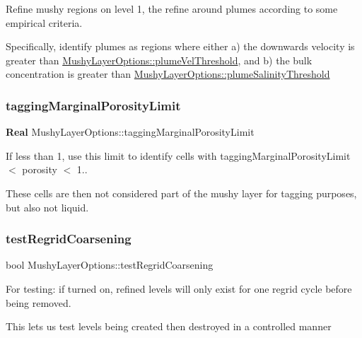 Refine mushy regions on level 1, the refine around plumes according to some empirical criteria. 

Specifically, identify plumes as regions where either a) the downwards velocity is greater than \hyperlink{struct_mushy_layer_options_aef2b8175ef13294cdd87e521b89cc104}{Mushy\+Layer\+Options\+::plume\+Vel\+Threshold}, and b) the bulk concentration is greater than \hyperlink{struct_mushy_layer_options_a496277fda822832718ebe3a32479b24b}{Mushy\+Layer\+Options\+::plume\+Salinity\+Threshold} \mbox{\label{struct_mushy_layer_options_a940a2f3dfcfa29a2415eb48836369615}} 
\subsubsection{\texorpdfstring{tagging\+Marginal\+Porosity\+Limit}{taggingMarginalPorosityLimit}}
{\footnotesize\ttfamily \textbf{ Real} Mushy\+Layer\+Options\+::tagging\+Marginal\+Porosity\+Limit}



If less than 1, use this limit to identify cells with tagging\+Marginal\+Porosity\+Limit $<$ porosity $<$ 1.. 

These cells are then not considered part of the mushy layer for tagging purposes, but also not liquid. \mbox{\label{struct_mushy_layer_options_a837666f529c0421b42d23bf175094066}} 
\subsubsection{\texorpdfstring{test\+Regrid\+Coarsening}{testRegridCoarsening}}
{\footnotesize\ttfamily bool Mushy\+Layer\+Options\+::test\+Regrid\+Coarsening}



For testing\+: if turned on, refined levels will only exist for one regrid cycle before being removed. 

This let\textquotesingle{}s us test levels being created then destroyed in a controlled manner \mbox{\label{struct_mushy_layer_options_a4d2370260d6a49bf5a988f379592320c}} 
